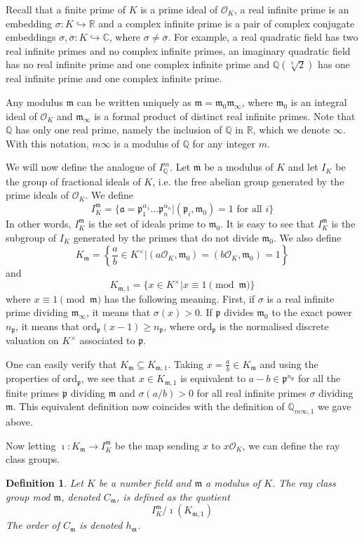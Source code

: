 \documentclass[]{amsart}
\newtheorem{defn}{Definition}
\newcommand{\Q}{\mathbb{Q}}
\newcommand{\R}{\mathbb{R}}
\newcommand{\C}{\mathbb{C}}
\newcommand{\rarr}{\longrightarrow}
\newcommand{\mn}{\mathfrak{m}_0}
\newcommand{\mi}{\mathfrak{m}_\infty}
\newcommand{\m}{\mathfrak{m}}
\newcommand{\IKm}{I^\mathfrak{m}_K}
\newcommand{\Km}{K_{\mathfrak{m}}}
\newcommand{\Kmo}{K_{\mathfrak{m},1}}
\renewcommand{\a}{\mathfrak{a}}
\newcommand{\OK}{\mathcal{O}_K}
\newcommand{\p}{\mathfrak{p}}
\begin{document}
	Recall that a finite prime of $K$ is a prime ideal of $\OK$, a real infinite prime is an embedding $\sigma:K\hookrightarrow\R$ and a complex infinite prime is a pair of complex conjugate embeddings $\sigma,\overline{\sigma}:K\hookrightarrow\C$, where $\sigma\neq \overline{\sigma}$. For example, a real quadratic field has two real infinite primes and no complex infinite primes, an imaginary quadratic field has no real infinite prime and one complex infinite prime and $\Q(\sqrt[3]{2})$ has one real infinite prime and one complex infinite prime. 
	
	Any modulus $\m$ can be written uniquely as $\m=\mn\mi$, where $\mn$ is an integral ideal of $\OK$ and $\mi$ is a formal product of distinct real infinite primes. Note that $\Q$ has only one real prime, namely the inclusion of $\Q$ in $\R$, which we denote $\infty$. With this notation, $m\infty$ is a modulus of $\Q$ for any integer $m$.
	
	We will now define the analogue of $I_\Q^m$. Let $\m$ be a modulus of $K$ and let $I_K$ be the group of fractional ideals of $K$, i.e. the free abelian group generated by the prime ideals of $\OK$. We define
	\[\IKm =\{\a=\p_1^{\alpha_1}\dots \p_n^{\alpha_n}|(\p_i,\mn)=1\text{ for all }i\}\]
	In other words, $\IKm$ is the set of ideals prime to $\mn$. It is easy to see that $\IKm$ is the subgroup of $I_K$ generated by the primes that do not divide $\m_0$. We also define
	\[K_\m=\left \{\frac{a}{b}\in K^\times|(a\OK,\mn)=(b\OK,\mn)=1\right \}\]
	and
	\[\Kmo=\{x\in K^\times|x\equiv 1\pmod\m\}\]
	where $x\equiv 1\pmod \m$ has the following meaning. First, if $\sigma$ is a real infinite prime dividing $\mi$, it means that $\sigma(x)>0$. If $\p$ divides $\mn$ to the exact power $n_\p$, it means that $\text{ord}_\p(x-1)\geq n_\p$, where $\text{ord}_\p$ is the normalised discrete valuation on $K^\times$ associated to $\p$. 
	
	One can easily verify that $\Km\subseteq\Kmo$. Taking $x=\frac{a}{b}\in\Km$ and using the properties of $\text{ord}_\p$, we see that $x\in\Kmo$ is equivalent to $a-b\in\p^{n_\p}$ for all the finite primes $\p$ dividing $\m$ and $\sigma(a/b)>0$ for all real infinite primes $\sigma$ dividing $\m$. This equivalent definition now coincides with the definition of $\Q_{m\infty,1}$ we gave above.
	
	Now letting $\imath:\Km\rarr \IKm$ be the map sending $x$ to $x\OK$, we can define the ray class groups.
	
	\begin{defn}
		Let $K$ be a number field and $\m$ a modulus of $K$. The ray class group mod $\m$, denoted $C_\m$, is defined as the quotient
		\[\IKm/\imath(\Kmo)\]
		The order of $C_\m$ is denoted $h_\m$. 
	\end{defn}
	
\end{document}
